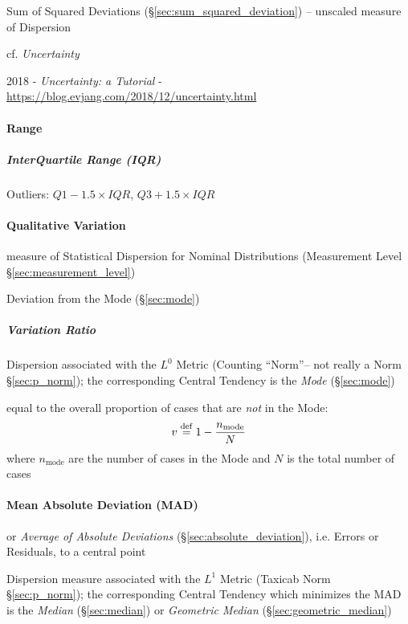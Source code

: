 \fist Sum of Squared Deviations (\S\ref{sec:sum_squared_deviation}) -- unscaled
measure of Dispersion

cf. \emph{Uncertainty}

2018 - \emph{Uncertainty: a Tutorial} -
\url{https://blog.evjang.com/2018/12/uncertainty.html}



\paragraph{Range}\label{sec:range}\hfill

\subparagraph{InterQuartile Range (IQR)}\label{sec:iqr}\hfill

Outliers:  $Q1 - 1.5 \times IQR$, $Q3 + 1.5 \times IQR$



\paragraph{Qualitative Variation}\label{sec:qualitative_variation}\hfill

measure of Statistical Dispersion for {Nominal Distributions} (Measurement Level
\S\ref{sec:measurement_level})

Deviation from the Mode (\S\ref{sec:mode})



\subparagraph{Variation Ratio}\label{sec:variation_ratio}\hfill

Dispersion associated with the $L^0$ Metric (Counting ``Norm''-- not really a
Norm \S\ref{sec:p_norm}); the corresponding Central Tendency is the \emph{Mode}
(\S\ref{sec:mode})

equal to the overall proportion of cases that are \emph{not} in the Mode:
\[
  v \stackrel{\mathrm{def}}= 1 - \frac{n_{\text{mode}}}{N}
\]
where $n_{\text{mode}}$ are the number of cases in the Mode and $N$ is the total
number of cases



\paragraph{Mean Absolute Deviation (MAD)}\label{sec:mad}\hfill

or \emph{Average of Absolute Deviations} (\S\ref{sec:absolute_deviation}), i.e.
Errors or Residuals, to a central point

Dispersion measure associated with the $L^1$ Metric (Taxicab Norm
\S\ref{sec:p_norm}); the corresponding Central Tendency which minimizes the MAD
is the \emph{Median} (\S\ref{sec:median}) or \emph{Geometric Median}
(\S\ref{sec:geometric_median})

